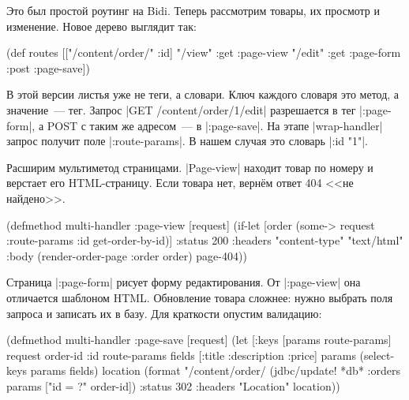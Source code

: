 Это был простой роутинг на Bidi. Теперь рассмотрим товары, их
просмотр и изменение. Новое дерево выглядит так:

\begin{english}
  \begin{clojure}
(def routes
  [["/content/order/" :id] {"/view" {:get  :page-view}
                            "/edit" {:get  :page-form
                                     :post :page-save}}])
  \end{clojure}
\end{english}

В этой версии листья уже не теги, а словари. Ключ каждого словаря это метод, а
значение~--- тег. Запрос \spverb|GET /content/order/1/edit| разрешается в тег
\spverb|:page-form|, а POST с таким же адресом~--- в \spverb|:page-save|.  На
этапе \spverb|wrap-handler| запрос получит поле \spverb|:route-params|.  В нашем
случая это словарь \spverb|{:id "1"}|.


Расширим мультиметод страницами. \spverb|Page-view| находит товар по номеру и
верстает его HTML-страницу. Если товара нет, верн\"{е}м ответ 404 <<не
найдено>>.

\begin{english}
  \begin{clojure}
(defmethod multi-handler :page-view
  [request]
  (if-let [order (some-> request
                         :route-params
                         :id
                         get-order-by-id)]
    {:status 200
     :headers {"content-type" "text/html"}
     :body (render-order-page {:order order})}
    page-404))
  \end{clojure}
\end{english}

Страница \spverb|:page-form| рисует форму редактирования. От \spverb|:page-view|
она отличается шаблоном HTML. Обновление товара сложнее: нужно выбрать поля
запроса и записать их в базу. Для краткости опустим валидацию:

\begin{english}
  \begin{clojure}
(defmethod multi-handler :page-save
  [request]
  (let [{:keys [params route-params]} request
        {order-id :id} route-params
        fields [:title :description :price]
        params (select-keys params fields)
        location (format "/content/order/%
    (jdbc/update! *db* :orders params ["id = ?" order-id])
    {:status 302
     :headers {"Location" location}}))
  \end{clojure}
\end{english}

